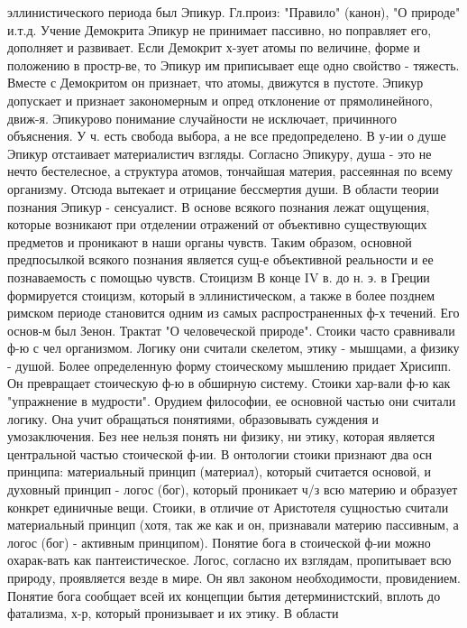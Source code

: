 \documentclass[12pt]{article}
\begin{document}
эллинистического периода был Эпикур. Гл.произ: "Правило" (канон), "О природе" и.т.д. Учение Демокрита
Эпикур не принимает пассивно, но поправляет его, дополняет и развивает. Если Демокрит х-зует атомы по
величине, форме и положению в простр-ве, то Эпикур им приписывает еще одно свойство - тяжесть. Вместе с
Демокритом он признает, что атомы, движутся в пустоте. Эпикур допускает и признает закономерным и опред
отклонение  от  прямолинейного,  движ-я.  Эпикурово  понимание  случайности  не  исключает,  причинного
объяснения.  У  ч.  есть  свобода  выбора,  а  не  все  предопределено.  В  у-ии  о  душе  Эпикур  отстаивает
материалистич взгляды. Согласно Эпикуру, душа - это не нечто бестелесное, а структура атомов, тончайшая
материя, рассеянная по всему организму. Отсюда вытекает и отрицание бессмертия души. В области теории
познания Эпикур - сенсуалист. В основе всякого познания лежат ощущения, которые возникают при отделении
отражений  от  объективно  существующих  предметов  и  проникают  в  наши  органы  чувств.  Таким  образом,
основной  предпосылкой  всякого  познания  является  сущ-е  объективной  реальности  и  ее  познаваемость  с
помощью чувств. 
Стоицизм В конце IV в. до н. э. в Греции формируется стоицизм, который в эллинистическом, а также в более
позднем римском периоде становится одним из самых распространенных ф-х течений. Его основ-м был Зенон.
Трактат  "О  человеческой  природе".  Стоики  часто  сравнивали  ф-ю  с  чел  организмом.  Логику  они  считали
скелетом, этику - мышцами, а физику - душой. Более определенную форму стоическому мышлению придает
Хрисипп. Он  превращает стоическую  ф-ю  в  обширную  систему.  Стоики  хар-вали ф-ю  как "упражнение  в
мудрости". Орудием философии, ее основной частью они считали логику. Она учит обращаться понятиями,
образовывать  суждения  и  умозаключения.  Без  нее  нельзя  понять  ни  физику,  ни  этику,  которая  является
центральной частью стоической ф-ии. В онтологии стоики признают два осн принципа: материальный принцип
(материал), который считается основой, и духовный принцип - логос (бог), который проникает ч/з всю материю
и образует конкрет единичные  вещи.  Стоики,  в отличие от Аристотеля  сущностью  считали материальный
принцип (хотя, так же как и он, признавали материю пассивным, а логос (бог) - активным принципом). Понятие
бога в стоической ф-ии можно охарак-вать как пантеистическое. Логос, согласно их взглядам, пропитывает всю
природу, проявляется везде в мире. Он явл законом необходимости, провидением. Понятие бога сообщает всей
их концепции бытия детерминистский, вплоть до фатализма, х-р, который пронизывает и их этику. В области
\end{document}
